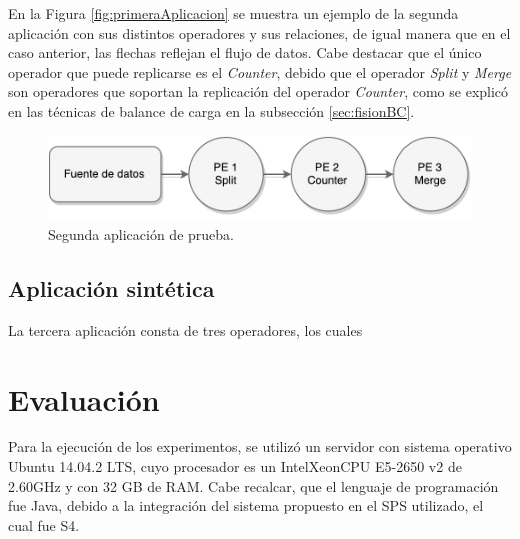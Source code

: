 En la Figura \ref{fig:primeraAplicacion} se muestra un ejemplo de la segunda aplicación con sus distintos operadores y sus relaciones, de igual manera que en el caso anterior, las flechas reflejan el flujo de datos. Cabe destacar que el único operador que puede replicarse es el \textit{Counter}, debido que el operador \textit{Split} y \textit{Merge} son operadores que soportan la replicación del operador \textit{Counter}, como se explicó en las técnicas de balance de carga en la subsección \ref{sec:fisionBC}.

\begin{figure}[!hb]
	\centering
		\includegraphics[scale=0.75]{images/App2.pdf}
	\caption{Segunda aplicación de prueba.}
	\label{fig:segundaAplicacion}
\end{figure}

\subsection{Aplicación sintética}
La tercera aplicación consta de tres operadores, los cuales 

\section{Evaluación}

Para la ejecución de los experimentos, se utilizó un servidor con sistema operativo Ubuntu 14.04.2 LTS, cuyo procesador es un Intel\textregistered Xeon\textregistered CPU E5-2650 v2 de 2.60GHz y con 32 GB de RAM. Cabe recalcar, que el lenguaje de programación fue Java, debido a la integración del sistema propuesto en el SPS utilizado, el cual fue S4.

